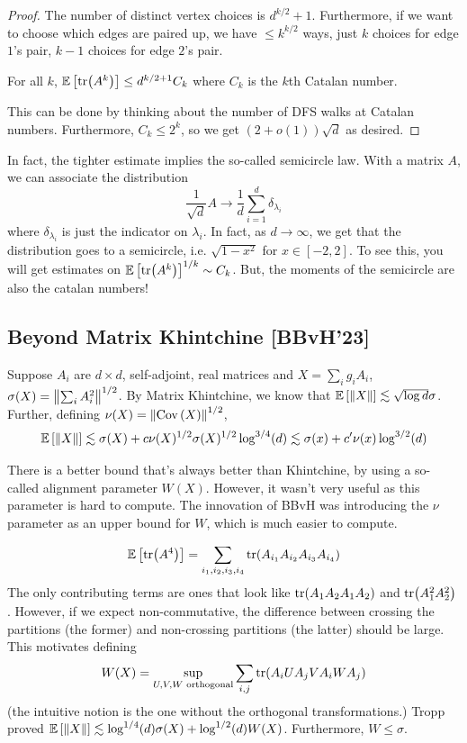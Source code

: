 \begin{proof}
    The number of distinct vertex choices is $d^{k/2} + 1$. Furthermore, if we want to choose which edges are paired up, we have $\le k^{k/2}$
    ways, just $k$ choices for edge $1$'s pair, $k-1$ choices for edge $2$'s pair.

    \begin{lemma}
        For all $k$, $\mathbb{E}\left[ \tr(A^k) \right] \le d^{k/2 + 1} C_k$
        where $C_k$ is the $k$th Catalan number.
    \end{lemma}
    This can be done by thinking about the number of DFS walks at Catalan numbers. Furthermore, $C_k \le 2^k$,
    so we get $(2+o(1))\sqrt{d}$ as desired.
\end{proof}

In fact, the tighter estimate implies the so-called semicircle law.
With a matrix $A$, we can associate the distribution
\[ \frac{1}{\sqrt{d}} A \to \frac{1}{d} \sum_{i = 1}^{d} \delta_{\lambda_i} \]
where $\delta_{\lambda_i}$ is just the indicator on $\lambda_i$.
In fact, as $d \to \infty$, we get that the distribution goes to a semicircle, i.e. $\sqrt{1 - x^2}$ for $x\in[-2, 2]$.
To see this, you will get estimates on $\mathbb{E}\left[ \tr(A^k) \right]^{1/k} \sim C_k$. But, the moments of the semicircle
are also the catalan numbers!

\subsection{ Beyond Matrix Khintchine [BBvH'23] }

\begin{theorem}
    Suppose $A_i$ are $d \times d$, self-adjoint, real matrices and
    $X = \sum_i g_i A_i$, $\sigma(X) = \norm{\sum_i A_i^2}^{1/2}$.
    By Matrix Khintchine, we know that $\mathbb{E}\left[ \norm{X} \right] \lesssim \sqrt{\log d} \sigma$. Further,
    defining $\nu(X) = \norm{\text{Cov}\left( X \right)}^{1/2}$,
    \[ \mathbb{E}\left[ \norm{X} \right] \lesssim \sigma(X) + c \nu(X)^{1/2} \sigma(X)^{1/2} \log^{3/4}(d) \lesssim \sigma(x) + c' \nu(x) \log^{3/2}(d) \]
\end{theorem}

There is a better bound that's always better than Khintchine,
by using a so-called alignment parameter $W(X)$. However, it wasn't very useful as this parameter is hard to compute.
The innovation of BBvH was introducing the $\nu$ parameter as an upper bound for $W$, which is much easier to compute.

\[ \mathbb{E}\left[ \tr(A^4) \right] = \sum_{i_1, i_2, i_3, i_4} \tr(A_{i_1} A_{i_2} A_{i_3} A_{i_4}) \]
The only contributing terms are ones that look like $\tr(A_1 A_2 A_1 A_2)$ and $\tr(A_1^2 A_2^2)$.
However, if we expect non-commutative, the difference between crossing the partitions 
(the former) and non-crossing partitions (the latter) should be large. This motivates defining
\[ W(X) = \sup_{U, V, W \text{ orthogonal}} \sum_{i,j} \tr(A_i U A_j V A_i W A_j) \]
(the intuitive notion is the one without the orthogonal transformations.)
Tropp proved $\mathbb{E}\left[ \norm{X} \right] \lesssim \log^{1/4}(d) \sigma(X) + \log^{1/2}(d) W(X)$.
Furthermore, $W \le \sigma$.


